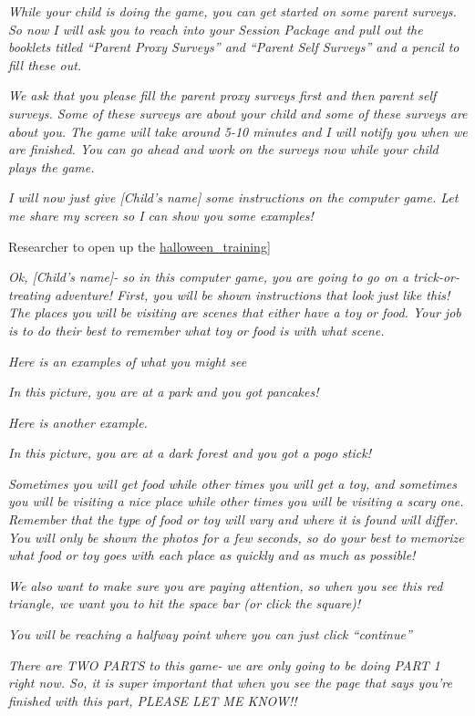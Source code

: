 \documentclass[]{book}
\begin{document}
\emph{While your child is doing the game, you can get started on some parent surveys. So now I will ask you to reach into your Session Package and pull out the booklets titled ``Parent Proxy Surveys'' and ``Parent Self Surveys'' and a pencil to fill these out.}

\emph{We ask that you please fill the parent proxy surveys first and then parent self surveys. Some of these surveys are about your child and some of these surveys are about you. The game will take around 5-10 minutes and I will notify you when we are finished. You can go ahead and work on the surveys now while your child plays the game.}

\emph{I will now just give {[}Child's name{]} some instructions on the computer game. Let me share my screen so I can show you some examples!}

Researcher to open up the \href{https://app.box.com/file/784726680410}{halloween\_training}{]}

\emph{Ok, {[}Child's name{]}- so in this computer game, you are going to go on a trick-or-treating adventure! First, you will be shown instructions that look just like this! The places you will be visiting are scenes that either have a toy or food. Your job is to do their best to remember what toy or food is with what scene.}

\emph{Here is an examples of what you might see}

\emph{In this picture, you are at a park and you got pancakes!}

\emph{Here is another example.}

\emph{In this picture, you are at a dark forest and you got a pogo stick!}

\emph{Sometimes you will get food while other times you will get a toy, and sometimes you will be visiting a nice place while other times you will be visiting a scary one. Remember that the type of food or toy will vary and where it is found will differ. You will only be shown the photos for a few seconds, so do your best to memorize what food or toy goes with each place as quickly and as much as possible!}

\emph{We also want to make sure you are paying attention, so when you see this red triangle, we want you to hit the space bar (or click the square)!}

\emph{You will be reaching a halfway point where you can just click ``continue''}

\emph{There are TWO PARTS to this game- we are only going to be doing PART 1 right now. So, it is super important that when you see the page that says you're finished with this part, PLEASE LET ME KNOW!!}
\end{document}

